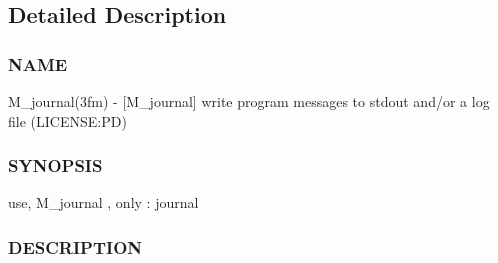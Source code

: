 \subsection{Detailed Description}
\subsubsection*{N\+A\+ME}

M\+\_\+journal(3fm) -\/ \mbox{[}M\+\_\+journal\mbox{]} write program messages to stdout and/or a log file (L\+I\+C\+E\+N\+SE\+:PD) \subsubsection*{S\+Y\+N\+O\+P\+S\+IS}

use, M\+\_\+journal , only \+: journal \subsubsection*{D\+E\+S\+C\+R\+I\+P\+T\+I\+ON}

